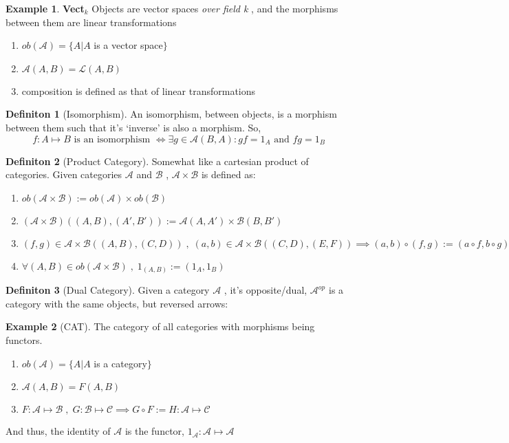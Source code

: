\documentclass{article}
\theoremstyle{definition}
\newtheorem{example}{Example}[section]
\theoremstyle{definition}
\newtheorem{definition}{Definiton}[section]
\begin{document}
\begin{example}{\textbf{Vect$ _k$ }} %
Objects are vector spaces \textit{over field k} , and the morphisms between them are linear transformations
	\begin{enumerate}[label=\roman*]
	\item $ ob(\mathcal{A} ) = \{A | A $ is  a vector space$   \}$
	\item $ \mathcal{A} (A,B) = \mathcal{L} (A,B) $
	\item  composition is defined as that of linear transformations
\end{enumerate}
\end{example}
\begin{definition}[Isomorphism] %
	An isomorphism, between objects, is a morphism between them such that it's `inverse' is also a morphism. So,
	\[ f: A \mapsto B \text{ is an isomorphism } \iff \exists g \in \mathcal{A}(B,A): gf=1_A \text{ and } fg=1_B\]
\end{definition}
\begin{definition}[Product Category] %
	Somewhat like a cartesian product of categories. Given categories $ \mathcal{A}  $ and $ \mathcal{B}  $ , $ \mathcal{A}  \times \mathcal{B}  $ is defined as:
	\begin{enumerate}[label=\roman*]
		\item $ ob( \mathcal{A}  \times \mathcal{B}) := ob(\mathcal{A} ) \times ob(\mathcal{B} )$
		\item $(\mathcal{A} \times \mathcal{B})((A,B),(A',B')):=\mathcal{A} (A,A')\times\mathcal{B} (B,B') $
		\item $ (f,g) \in \mathcal{A}\times \mathcal{B} ((A,B),(C,D)) \; , \;(a,b) \in \mathcal{A}\times \mathcal{B} ((C,D),(E,F)) \implies (a,b) \circ (f,g) := (a \circ f, b \circ g)$
		\item $ \forall (A,B) \in ob(\mathcal{A}\times \mathcal{B})\; , \; 1_{(A,B)}:=(1_A,1_B) $
	\end{enumerate}
\end{definition}

\begin{definition}[Dual Category] %
	Given a category $ \mathcal{A}  $ , it's opposite/dual, $ \mathcal{A} ^{op}  $ is a category with the same objects, but reversed arrows:
	\[  \]
\end{definition}

\begin{example}[CAT] %
	The category of all categories with morphisms being functors.
	\begin{enumerate}[label=\roman*]
	\item $ ob(\mathcal{A} ) = \{A | A $ is  a category$   \}$
	\item $ \mathcal{A} (A,B) = F (A,B) $
	\item $ F: \mathcal{A}  \mapsto \mathcal{B}\;,\; G: \mathcal{B} \mapsto \mathcal{C} \implies G \circ F := H: \mathcal{A} \mapsto \mathcal{C} $
	\end{enumerate}
 And thus, the identity of $ \mathcal{A}  $ is the functor, $ 1_{\mathcal{A}} : \mathcal{A}  \mapsto \mathcal{A}  $
\end{example}
\end{document}
